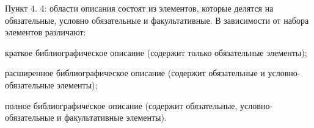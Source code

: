 Пункт 4. 4: области описания состоят из элементов, которые делятся на обязательные, условно обязательные и факультативные. В зависимости от набора элементов различают:

\begin{cutelist}
    \item краткое библиографическое описание (содержит только обязательные элементы);
    \item расширенное библиографическое описание (содержит обязательные и условно-обязательные элементы);
    \item полное библиографическое описание (содержит обязательные, ус\-лов\-но-обязательные и факультативные элементы).
\end{cutelist}

